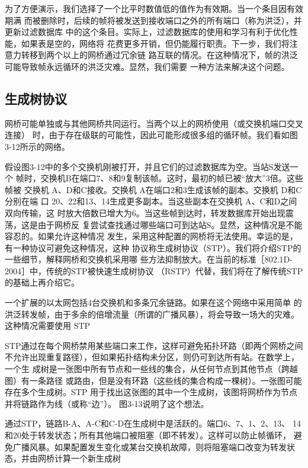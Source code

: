为了方便演示，我们选择了一个比平时数值低的值作为有效期。当一个条目因有效期满
而被删除时，后续的帧将被发送到接收端口之外的所有端口（称为洪泛），并更新过滤数据库
中的这个条目。实际上，过滤数据库的使用和学习有利于优化性能，如果表是空的，网络将
花费更多开销，但仍能履行职责。下一步，我们将注意力转移到两个以上的网桥通过冗余链
路互联的情况。在这种情况下，帧的洪泛可能导致帧永远循环的洪泛灾难。显然，我们需要
一种方法来解决这个问题。

\subsection{生成树协议}

网桥可能单独或与其他网桥共同运行。当两个以上的网桥使用（或交换机端口交叉连接）
时，由于存在级联的可能性，因此可能形成很多组的循环帧。我们看如图3-12所示的网络。

假设图3-12中的多个交换机刚被打开，并且它们的过滤数据库为空。当站S发送一个
帧时，交换机B在端口7、8和9复制该帧。这时，最初的帧已被“放大”3倍。这些帧被
交换机 A、D和C接收。交换机 A在端口2和3生成该帧的副本。交换机 D和C分别在端
口 20、22和13、14生成更多副本。当这些副本在交换机 A、C和D之间双向传输，这
时放大倍数已增大为6。当这些帧到达时，转发数据库开始出现震荡，这是由于网桥反
复尝试查找通过哪些端口可到达站S。显然，这种情况是不能容忍的。如果允许这种情况
发生，采用这种配置的网桥将无法使用。幸运的是，有一种协议可避免这种情况，这种
协议称生成树协议（STP）。我们将介绍STP的一些细节，解释网桥和交换机采用哪
些方法抑制放大。在当前的标准［802.1D-2004］中，传统的STP被快速生成树协议
（RSTP）代替，我们将在了解传统STP的基础上再介绍它。

一个扩展的以太网包括4台交换机和多条冗余链路。如果在这个网络中采用简单
的洪泛转发帧，由于多余的倍增流量（所谓的广播风暴），将会导致一场大的灾难。
这种情况需要使用 STP


STP通过在每个网桥禁用某些端口来工作，这样可避免拓扑环路（即两个网桥之间
不允许出现重复路径），但如果拓扑结构未分区，则仍可到达所有站。在数学上，一个生
成树是一张图中所有节点和一些线的集合，从任何节点到其他节点（跨越图）有一条路径
或路由，但是没有环路（这些线的集合构成一棵树）。一张图可能存在多个生成树。STP
用于找出这张图的其中一个生成树，该图将网桥作为节点并将链路作为线（或称“边”）。
图3-13说明了这个想法。

通过STP，链路B-A、A-C和C-D在生成树中是活跃的。端口6、7、1、2、13、
14和20处于转发状态；所有其他端口被阻塞（即不转发）。这样可以防止帧循环，
避免广播风暴。如果配置发生变化或某台交换机故障，则将阻塞端口改变为转发状
态，并由网桥计算一个新生成树


